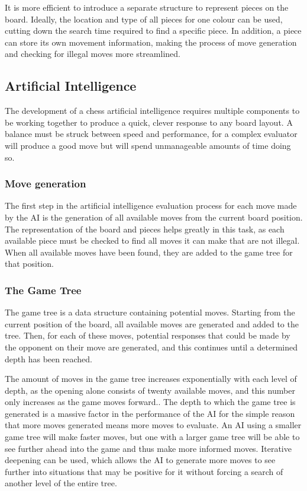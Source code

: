 \documentclass{l3proj}
\begin{document}
	It is more efficient to introduce a separate structure to represent pieces on the board. Ideally, the location and type of all pieces for one colour can be used, cutting down the search time required to find a specific piece. In addition, a piece can store its own movement information, making the process of move generation and checking for illegal moves more streamlined.

\subsection{Artificial Intelligence}

	The development of a chess artificial intelligence requires multiple components to be working together to produce a quick, clever response to any board layout. A balance must be struck between speed and performance, for a complex evaluator will produce a good move but will spend unmanageable amounts of time doing so.

\subsubsection{Move generation}

	The first step in the artificial intelligence evaluation process for each move made by the AI is the generation of all available moves from the current board position. The representation of the board and pieces helps greatly in this task, as each available piece must be checked to find all moves it can make that are not illegal. When all available moves have been found, they are added to the game tree for that position.

\subsubsection{The Game Tree}

	The game tree is a data structure containing potential moves. Starting from the current position of the board, all available moves are generated and added to the tree. Then, for each of these moves, potential responses that could be made by the opponent on their move are generated, and this continues until a determined depth has been reached.

	The amount of moves in the game tree increases exponentially with each level of depth, as the opening alone consists of twenty available moves, and this number only increases as the game moves forward.. The depth to which the game tree is generated is a massive factor in the performance of the AI for the simple reason that more moves generated means more moves to evaluate. An AI using a smaller game tree will make faster moves, but one with a larger game tree will be able to see further ahead into the game and thus make more informed moves. Iterative deepening can be used, which allows the AI to generate more moves to see further into situations that may be positive for it without forcing a search of another level of the entire tree.
\end{document}
